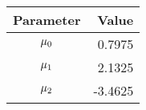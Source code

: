 \begin{tabular}{cr}
\hline
\textbf{Parameter} &  \textbf{Value} 
\\ \hline
 $\mu_0$ & 0.7975
\\ 
 $\mu_1$ & 2.1325
 \\
 $\mu_2$ & -3.4625
\\ \hline
\end{tabular}